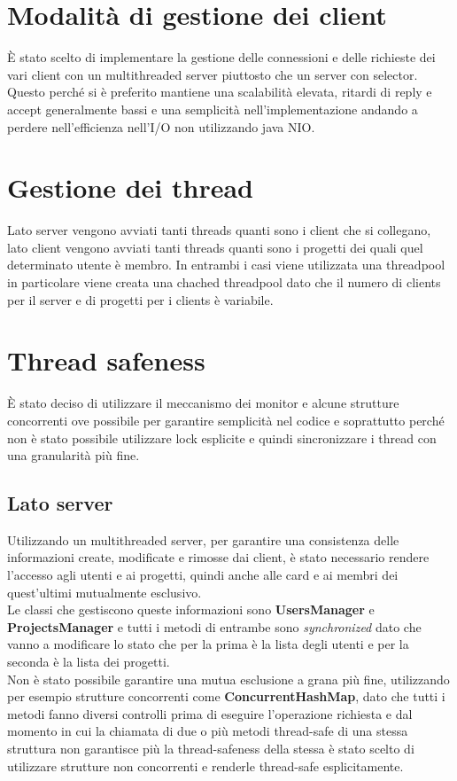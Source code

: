\documentclass[11pt]{report}
\begin{document}
	\section{Modalità di gestione dei client}
	È stato scelto di implementare la gestione delle connessioni e delle richieste dei vari client con un multithreaded server piuttosto che un server con selector.
	Questo perché si è preferito mantiene una scalabilità elevata, ritardi di reply e accept generalmente bassi e una semplicità nell'implementazione andando a perdere nell'efficienza nell'I/O non utilizzando java NIO.
	
	\section{Gestione dei thread}
	Lato server vengono avviati tanti threads quanti sono i client che si collegano, lato client vengono avviati tanti threads quanti sono i progetti dei quali quel determinato utente è membro.
	In entrambi i casi viene utilizzata una threadpool in particolare viene creata una chached threadpool dato che il numero di clients per il server e di progetti per i clients è variabile.
	
	\section{Thread safeness}
	È stato deciso di utilizzare il meccanismo dei monitor e alcune strutture concorrenti ove possibile per garantire semplicità nel codice e soprattutto perché non è stato possibile utilizzare lock esplicite e quindi sincronizzare i thread con una granularità più fine.
	
	\subsection{Lato server}
	Utilizzando un multithreaded server, per garantire una consistenza delle informazioni create, modificate e rimosse dai client, è stato necessario rendere l'accesso agli utenti e ai progetti, quindi anche alle card e ai membri dei quest'ultimi mutualmente esclusivo.\\
	Le classi che gestiscono queste informazioni sono \textbf{UsersManager} e \textbf{ProjectsManager} e tutti i metodi di entrambe sono \textit{synchronized} dato che vanno a modificare lo stato che per la prima è la lista degli utenti e per la seconda è la lista dei progetti.\\
	Non è stato possibile garantire una mutua esclusione a grana più fine, utilizzando per esempio strutture concorrenti come \textbf{ConcurrentHashMap}, dato che tutti i metodi fanno diversi controlli prima di eseguire l'operazione richiesta e dal momento in cui la chiamata di due o più metodi thread-safe di una stessa struttura non garantisce più la thread-safeness della stessa è stato scelto di utilizzare strutture non concorrenti e renderle thread-safe esplicitamente.
	
\end{document}
